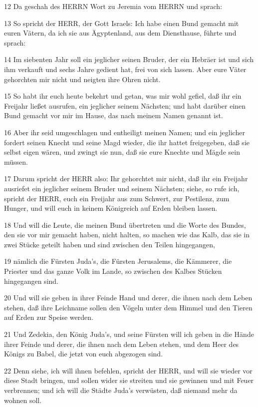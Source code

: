 \par 12 Da geschah des HERRN Wort zu Jeremia vom HERRN und sprach:
\par 13 So spricht der HERR, der Gott Israels: Ich habe einen Bund gemacht mit euren Vätern, da ich sie aus Ägyptenland, aus dem Diensthause, führte und sprach:
\par 14 Im siebenten Jahr soll ein jeglicher seinen Bruder, der ein Hebräer ist und sich ihm verkauft und sechs Jahre gedient hat, frei von sich lassen. Aber eure Väter gehorchten mir nicht und neigten ihre Ohren nicht.
\par 15 So habt ihr euch heute bekehrt und getan, was mir wohl gefiel, daß ihr ein Freijahr ließet ausrufen, ein jeglicher seinem Nächsten; und habt darüber einen Bund gemacht vor mir im Hause, das nach meinem Namen genannt ist.
\par 16 Aber ihr seid umgeschlagen und entheiligt meinen Namen; und ein jeglicher fordert seinen Knecht und seine Magd wieder, die ihr hattet freigegeben, daß sie selbst eigen wären, und zwingt sie nun, daß sie eure Knechte und Mägde sein müssen.
\par 17 Darum spricht der HERR also: Ihr gehorchtet mir nicht, daß ihr ein Freijahr ausriefet ein jeglicher seinem Bruder und seinem Nächsten; siehe, so rufe ich, spricht der HERR, euch ein Freijahr aus zum Schwert, zur Pestilenz, zum Hunger, und will euch in keinem Königreich auf Erden bleiben lassen.
\par 18 Und will die Leute, die meinen Bund übertreten und die Worte des Bundes, den sie vor mir gemacht haben, nicht halten, so machen wie das Kalb, das sie in zwei Stücke geteilt haben und sind zwischen den Teilen hingegangen,
\par 19 nämlich die Fürsten Juda's, die Fürsten Jerusalems, die Kämmerer, die Priester und das ganze Volk im Lande, so zwischen des Kalbes Stücken hingegangen sind.
\par 20 Und will sie geben in ihrer Feinde Hand und derer, die ihnen nach dem Leben stehen, daß ihre Leichname sollen den Vögeln unter dem Himmel und den Tieren auf Erden zur Speise werden.
\par 21 Und Zedekia, den König Juda's, und seine Fürsten will ich geben in die Hände ihrer Feinde und derer, die ihnen nach dem Leben stehen, und dem Heer des Königs zu Babel, die jetzt von euch abgezogen sind.
\par 22 Denn siehe, ich will ihnen befehlen, spricht der HERR, und will sie wieder vor diese Stadt bringen, und sollen wider sie streiten und sie gewinnen und mit Feuer verbrennen; und ich will die Städte Juda's verwüsten, daß niemand mehr da wohnen soll.

